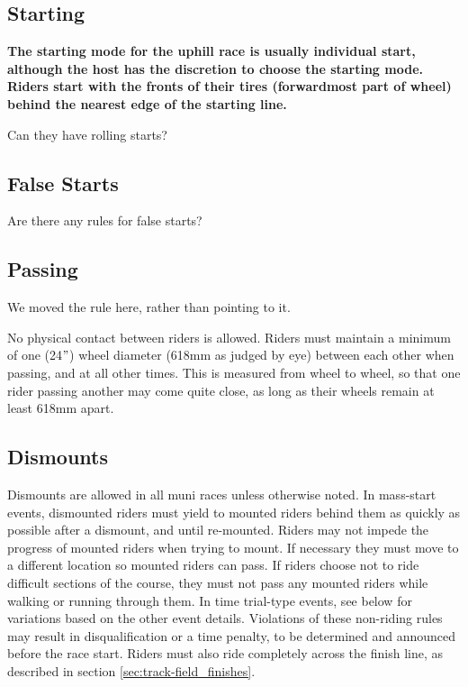 \subsection{Starting}

\textbf{The starting mode for the uphill race is usually individual 
start, although the host has the discretion to choose the starting 
mode. Riders start with the fronts of their tires (forwardmost part of wheel) behind the nearest edge of the starting line.}

\begin{framed}
Can they have rolling starts?
\end{framed}

\subsection{False Starts}

\begin{framed}
Are there any rules for false starts?
\end{framed}

\subsection{Passing}

\begin{framed}
We moved the rule here, rather than pointing to it.
\end{framed}

No physical contact between riders is allowed.
Riders must maintain a minimum of one (24$"$) wheel diameter (618mm as judged by eye) between each other when passing, and at all other times.
This is measured from wheel to wheel, so that one rider passing another may come quite close, as long as their wheels remain at least 618mm apart.

\subsection{Dismounts}
Dismounts are allowed in all muni races unless otherwise noted.
In mass-start events, dismounted riders must yield to mounted riders behind them as quickly as possible after a dismount, and until re-mounted.
Riders may not impede the progress of mounted riders when trying to mount.
If necessary they must move to a different location so mounted riders can pass.
If riders choose not to ride difficult sections of the course, they must not pass any mounted riders while walking or running through them.
In time trial-type events, see below for variations based on the other event details.
Violations of these non-riding rules may result in disqualification or a time penalty, to be determined and announced before the race start.
Riders must also ride completely across the finish line, as described in section \ref{sec:track-field_finishes}.

